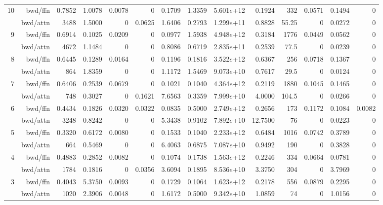 \begin{table*}[t]
\begin{center}
\begin{tiny}
\begin{sc}
\begin{tabular}{rrrrrrrrrrrrrr}
\midrule
\multirow{2}{*}{10} & bwd/ffn & 0.7852 & 1.0078 & 0.0078 & 0 & 0.1709 & 1.3359 & 5.601$e$+12 & 0.1924 & 332 & 0.0571 & 0.1494 & 0 \\
 & bwd/attn & 3488 & 1.5000 & 0 & 0.0625 & 1.6406 & 0.2793 & 1.299$e$+11 & 0.8828 & 55.25 & 0 & 0.0272 & 0 \\
\midrule
\multirow{2}{*}{9} & bwd/ffn & 0.6914 & 0.1025 & 0.0209 & 0 & 0.0977 & 1.5938 & 4.948$e$+12 & 0.3184 & 1776 & 0.0449 & 0.0562 & 0 \\
 & bwd/attn & 4672 & 1.1484 & 0 & 0 & 0.8086 & 0.6719 & 2.835$e$+11 & 0.2539 & 77.5 & 0 & 0.0239 & 0 \\
\midrule
\multirow{2}{*}{8} & bwd/ffn & 0.6445 & 0.1289 & 0.0164 & 0 & 0.1196 & 0.1816 & 3.522$e$+12 & 0.6367 & 256 & 0.0718 & 0.1367 & 0 \\
 & bwd/attn & 864 & 1.8359 & 0 & 0 & 1.1172 & 1.5469 & 9.073$e$+10 & 0.7617 & 29.5 & 0 & 0.0124 & 0 \\
\midrule
\multirow{2}{*}{7} & bwd/ffn & 0.6406 & 0.2539 & 0.0679 & 0 & 0.1021 & 0.1040 & 4.364$e$+12 & 0.2119 & 1880 & 0.1045 & 0.1465 & 0 \\
 & bwd/attn & 748 & 0.3027 & 0 & 0.1621 & 7.6563 & 0.3359 & 7.999$e$+10 & 4.0000 & 104.5 & 0 & 0.0266 & 0 \\
\midrule
\multirow{2}{*}{6} & bwd/ffn & 0.4434 & 0.1826 & 0.0320 & 0.0322 & 0.0835 & 0.5000 & 2.749$e$+12 & 0.2656 & 173 & 0.1172 & 0.1084 & 0.0082 \\
 & bwd/attn & 3248 & 0.8242 & 0 & 0 & 5.3438 & 0.9102 & 7.892$e$+10 & 12.7500 & 76 & 0 & 0.0223 & 0 \\
\midrule
\multirow{2}{*}{5} & bwd/ffn & 0.3320 & 0.6172 & 0.0080 & 0 & 0.1533 & 0.1040 & 2.233$e$+12 & 0.6484 & 1016 & 0.0742 & 0.3789 & 0 \\
 & bwd/attn & 664 & 0.5469 & 0 & 0 & 6.4063 & 0.6875 & 7.087$e$+10 & 0.9492 & 190 & 0 & 0.3828 & 0 \\
\midrule
\multirow{2}{*}{4} & bwd/ffn & 0.4883 & 0.2852 & 0.0082 & 0 & 0.1074 & 0.1738 & 1.563$e$+12 & 0.2246 & 334 & 0.0664 & 0.0781 & 0 \\
 & bwd/attn & 1784 & 0.1816 & 0 & 0.0356 & 3.6094 & 0.1895 & 8.536$e$+10 & 3.3750 & 304 & 0 & 3.7969 & 0 \\
\midrule
\multirow{2}{*}{3} & bwd/ffn & 0.4043 & 5.3750 & 0.0093 & 0 & 0.1729 & 0.1064 & 1.623$e$+12 & 0.2178 & 556 & 0.0879 & 0.2295 & 0 \\
 & bwd/attn & 1020 & 2.3906 & 0.0048 & 0 & 1.6172 & 0.5000 & 9.342$e$+10 & 1.0859 & 74 & 0 & 1.0156 & 0 \\

\end{tabular}
\end{sc}
\end{tiny}
\end{center}
\end{table*}
